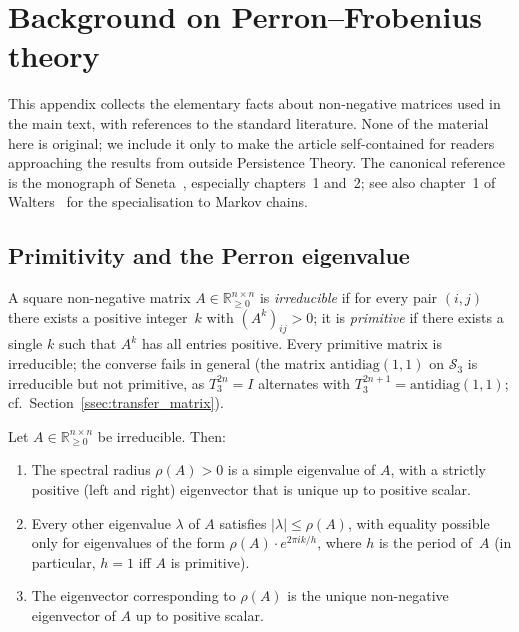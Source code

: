 \section{Background on Perron--Frobenius theory}
\label{app:perron_frobenius}

This appendix collects the elementary facts about non-negative
matrices used in the main text, with references to the standard
literature. None of the material here is original; we include it
only to make the article self-contained for readers approaching the
results from outside Persistence Theory. The canonical reference is
the monograph of Seneta~\cite{Seneta2006}, especially chapters~1
and~2; see also chapter~1 of Walters~\cite{Walters1982} for the
specialisation to Markov chains.

\subsection{Primitivity and the Perron eigenvalue}
\label{appssec:primitivity}

A square non-negative matrix $A \in \mathbb{R}_{\geq 0}^{n \times n}$
is \emph{irreducible} if for every pair $(i, j)$ there exists a
positive integer~$k$ with $(A^k)_{ij} > 0$; it is \emph{primitive}
if there exists a single $k$ such that $A^k$ has all entries
positive. Every primitive matrix is irreducible; the converse fails
in general (the matrix $\mathrm{antidiag}(1, 1)$ on
$\mathcal{S}_3$ is irreducible but not primitive, as $T_3^{2n} =
I$ alternates with $T_3^{2n+1} = \mathrm{antidiag}(1, 1)$; cf.\
Section~\ref{ssec:transfer_matrix}).

\begin{theorem}
\label{thm:PF}
Let $A \in \mathbb{R}_{\geq 0}^{n \times n}$ be irreducible. Then:
\begin{enumerate}[itemsep=2pt]
  \item The spectral radius $\rho(A) > 0$ is a simple eigenvalue of
    $A$, with a strictly positive (left and right) eigenvector
    that is unique up to positive scalar.
  \item Every other eigenvalue $\lambda$ of $A$ satisfies
    $|\lambda| \leq \rho(A)$, with equality possible only for
    eigenvalues of the form $\rho(A) \cdot e^{2\pi i k / h}$,
    where $h$ is the period of~$A$ (in particular, $h = 1$ iff
    $A$ is primitive).
  \item The eigenvector corresponding to $\rho(A)$ is the unique
    non-negative eigenvector of $A$ up to positive scalar.
\end{enumerate}
\end{theorem}

